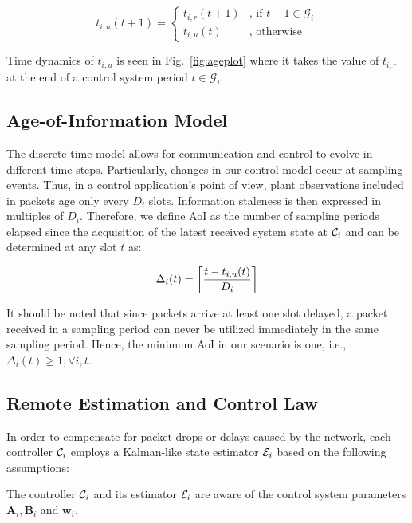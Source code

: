 \begin{equation}
  \label{eq:t_u}
  t_{i, u}(t+1) =
  \begin{cases}
  t_{i, r}(t+1) & \text{, if } t+1 \in \mathcal{G}_i \\ 
  t_{i, u}(t) & \text{, otherwise}	
  \end{cases} 
\end{equation}

Time dynamics of $t_{i,u}$ is seen in Fig.~\ref{fig:ageplot} where it takes the
value of $t_{i,r}$ at the end of a control system period $t \in \mathcal{G}_i$.

\subsection{Age-of-Information Model}
The discrete-time model allows for communication and control to evolve in
different time steps. Particularly, changes in our control model occur at
sampling events. Thus, in a control application's point of view, plant
observations included in packets age only every $D_i$ slots. Information
staleness is then expressed in multiples of $D_i$. Therefore, we define AoI as
the number of sampling periods elapsed since the acquisition of the latest
received system state at $\mathcal{C}_i$ and can be determined at any slot $t$ as:

\begin{equation}
  \label{eq:aoi}
  \Delta_i(t) = \left\lceil \dfrac{t - t_{i,u}(t)}{D_{i}} \right\rceil 
\end{equation}

It should be noted that since packets arrive at least one slot delayed, a packet
received in a sampling period can never be utilized immediately in the same
sampling period. Hence, the minimum AoI in our scenario is one, i.e.,
$\Delta_i(t) \ge 1,\forall i,t$.

\subsection{Remote Estimation and Control Law}
In order to compensate for packet drops or delays caused by the network, each
controller $\mathcal{C}_i$ employs a Kalman-like state estimator $\mathcal{E}_i$
based on the following assumptions:

\begin{theorem}
  The controller $\mathcal{C}_i$ and its estimator $\mathcal{E}_i$ are aware of the
  control system parameters $\boldsymbol{A}_i, \boldsymbol{B}_i$ and
  $\boldsymbol{w}_i$.
\end{theorem}

